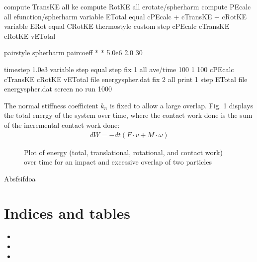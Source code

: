 \documentclass[letterpaper,10pt,english]{sphinxmanual}
\begin{document}
\begin{sphinxVerbatim}[commandchars=\\\{\}]
compute TransKE all ke
compute RotKE all erotate/spherharm
compute PEcalc all efunction/spherharm
variable ETotal equal \PYGZdq{}c\PYGZus{}PEcalc + c\PYGZus{}TransKE + c\PYGZus{}RotKE\PYGZdq{}
variable ERot equal \PYGZdq{}C\PYGZus{}RotKE\PYGZdq{}
thermo\PYGZus{}style custom step c\PYGZus{}PEcalc c\PYGZus{}TransKE c\PYGZus{}RotKE v\PYGZus{}ETotal

pair\PYGZus{}style  spherharm
pair\PYGZus{}coeff  * * 5.0e\PYGZhy{}6 2.0   30

timestep    1.0e\PYGZhy{}3
variable    step equal step
\PYGZsh{}fix     1 all ave/time 100 1 100 c\PYGZus{}PEcalc c\PYGZus{}TransKE c\PYGZus{}RotKE v\PYGZus{}ETotal  file energy\PYGZus{}spher.dat
\PYGZsh{}fix                2 all print 1 \PYGZdq{}\PYGZdl{}\PYGZob{}step\PYGZcb{} \PYGZdl{}\PYGZob{}ETotal\PYGZcb{}\PYGZdq{} file energy\PYGZus{}spher.dat screen no
run         1000
\end{sphinxVerbatim}

\sphinxAtStartPar
The normal stiffness coefficient \(k_n\) is fixed to allow a large overlap. Fig. 1 displays the total energy of the system over time, where the contact work done is the sum of the incremental contact work done:
\begin{equation*}
\begin{split}d W = -d t ({F}\cdot {v}+ {M}\cdot {\omega})\end{split}
\end{equation*}
\begin{figure}[htbp]
\centering
\capstart

\noindent{}
\caption{Plot of energy (total, translational, rotational, and contact work) over time for an impact and excessive overlap of two particles}\label{\detokenize{Sections/4_validation:id1}}\end{figure}

\sphinxAtStartPar
Absfsifdoa


\section{Indices and tables}
\label{\detokenize{index:indices-and-tables}}\begin{itemize}
\item {} 
\sphinxAtStartPar
{}

\item {} 
\sphinxAtStartPar
{}

\item {} 
\sphinxAtStartPar
{}

\end{itemize}



\renewcommand{\indexname}{Index}
\printindex
\end{document}
